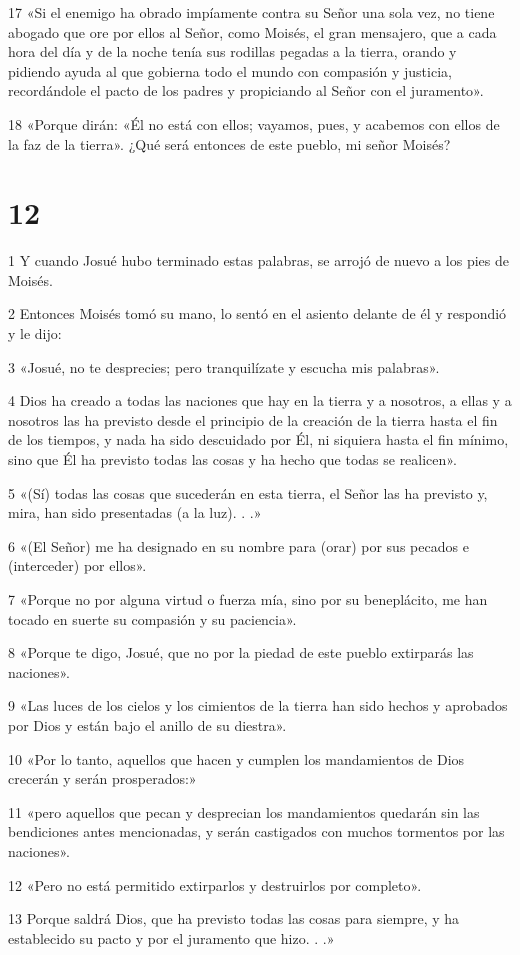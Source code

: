 \par 17 «Si el enemigo ha obrado impíamente contra su Señor una sola vez, no tiene abogado que ore por ellos al Señor, como Moisés, el gran mensajero, que a cada hora del día y de la noche tenía sus rodillas pegadas a la tierra, orando y pidiendo ayuda al que gobierna todo el mundo con compasión y justicia, recordándole el pacto de los padres y propiciando al Señor con el juramento».
\par 18 «Porque dirán: «Él no está con ellos; vayamos, pues, y acabemos con ellos de la faz de la tierra». ¿Qué será entonces de este pueblo, mi señor Moisés?

\chapter{12}

\par 1 Y cuando Josué hubo terminado estas palabras, se arrojó de nuevo a los pies de Moisés.
\par 2 Entonces Moisés tomó su mano, lo sentó en el asiento delante de él y respondió y le dijo:
\par 3 «Josué, no te desprecies; pero tranquilízate y escucha mis palabras».
\par 4 Dios ha creado a todas las naciones que hay en la tierra y a nosotros, a ellas y a nosotros las ha previsto desde el principio de la creación de la tierra hasta el fin de los tiempos, y nada ha sido descuidado por Él, ni siquiera hasta el fin mínimo, sino que Él ha previsto todas las cosas y ha hecho que todas se realicen».
\par 5 «(Sí) todas las cosas que sucederán en esta tierra, el Señor las ha previsto y, mira, han sido presentadas (a la luz). . .»
\par 6 «(El Señor) me ha designado en su nombre para (orar) por sus pecados e (interceder) por ellos».
\par 7 «Porque no por alguna virtud o fuerza mía, sino por su beneplácito, me han tocado en suerte su compasión y su paciencia».
\par 8 «Porque te digo, Josué, que no por la piedad de este pueblo extirparás las naciones».
\par 9 «Las luces de los cielos y los cimientos de la tierra han sido hechos y aprobados por Dios y están bajo el anillo de su diestra».
\par 10 «Por lo tanto, aquellos que hacen y cumplen los mandamientos de Dios crecerán y serán prosperados:»
\par 11 «pero aquellos que pecan y desprecian los mandamientos quedarán sin las bendiciones antes mencionadas, y serán castigados con muchos tormentos por las naciones».
\par 12 «Pero no está permitido extirparlos y destruirlos por completo».
\par 13 Porque saldrá Dios, que ha previsto todas las cosas para siempre, y ha establecido su pacto y por el juramento que hizo. . .»

